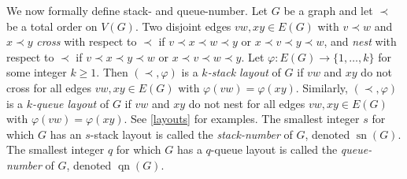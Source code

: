 \documentclass[kpfonts]{patmorin}
\DeclareMathOperator{\sn}{sn}
\DeclareMathOperator{\qn}{qn}
\renewcommand{\ge}{\geqslant}
\begin{document}
We now formally define stack- and queue-number. Let $G$ be a graph and let $\prec$ be a total order on $V(G)$.  Two disjoint edges $vw,xy\in E(G)$ with $v\prec w$ and $x\prec y$ \emph{cross} with respect to $\prec$ if $v\prec x\prec w\prec y$ or $x\prec v\prec y\prec w$, and \emph{nest} with respect to $\prec$ if $v\prec x\prec y\prec w$ or $x\prec v\prec w\prec y$. Let $\varphi:E(G)\to\{1,\ldots,k\}$ for some integer $k\ge 1$. Then $(\prec,\varphi)$ is a \emph{$k$-stack layout} of $G$ if $vw$ and $xy$ do not cross for all edges $vw,xy\in E(G)$ with $\varphi(vw) = \varphi(xy)$. Similarly, $(\prec,\varphi)$ is a \emph{$k$-queue layout} of $G$ if $vw$ and $xy$ do not nest for all edges $vw,xy\in E(G)$ with  $\varphi(vw)=\varphi(xy)$. See \cref{layouts} for examples. The smallest integer $s$ for which $G$ has an $s$-stack layout is called the \emph{stack-number} of $G$, denoted  $\sn(G)$. The smallest integer $q$ for which $G$ has a $q$-queue layout is called the \emph{queue-number} of $G$, denoted $\qn(G)$.
\end{document}
